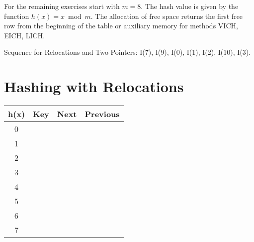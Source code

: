 \vspace{1cm}
For the remaining exercises start with $m = 8$. The hash value is given by the function $h(x) = x \bmod m$. The allocation of free space  returns the first free row from the beginning of the table or auxiliary memory for methods VICH, EICH, LICH.

Sequence for Relocations and Two Pointers: I(7), I(9), I(0), I(1), I(2), I(10), I(3).

\section*{Hashing with Relocations}
\begin{tabular}{|c|c|c|c|}
\hline
h(x) & Key & Next & Previous \\ \hline\hline
0 & \hspace{3cm} & \hspace{3cm} & \hspace{3cm} \\ \hline
1 & \hspace{3cm} & \hspace{3cm} & \hspace{3cm} \\ \hline
2 & \hspace{3cm} & \hspace{3cm} & \hspace{3cm} \\ \hline
3 & \hspace{3cm} & \hspace{3cm} & \hspace{3cm} \\ \hline
4 & \hspace{3cm} & \hspace{3cm} & \hspace{3cm} \\ \hline
5 & \hspace{3cm} & \hspace{3cm} & \hspace{3cm} \\ \hline
6 & \hspace{3cm} & \hspace{3cm} & \hspace{3cm} \\ \hline
7 & \hspace{3cm} & \hspace{3cm} & \hspace{3cm} \\ \hline
\end{tabular}

